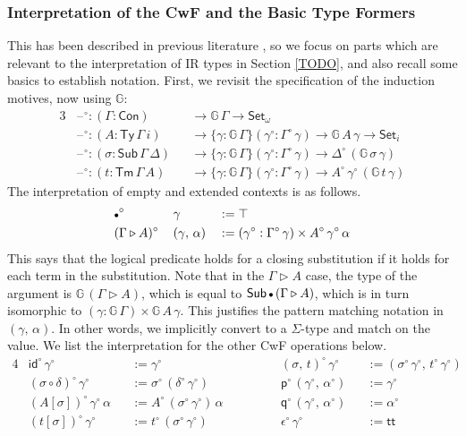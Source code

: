 \documentclass[acmsmall,screen,review,anonymous]{acmart}
\newcommand{\msf}[1]{{\mathsf{#1}}}
\newcommand{\mbb}[1]{\mathbb{#1}}
\newcommand{\p}{\mathsf{p}}
\newcommand{\q}{\mathsf{q}}
\newcommand{\Set}{\msf{Set}}
\newcommand{\ttt}{\msf{tt}}
\newcommand{\blank}{{\mathord{\hspace{1pt}\text{--}\hspace{1pt}}}}
\newcommand{\emptycon}{\scaleobj{.75}\bullet}
\newcommand{\id}{\msf{id}}
\newcommand{\Con}{\msf{Con}}
\newcommand{\Sub}{\msf{Sub}}
\newcommand{\Ty}{\msf{Ty}}
\newcommand{\Tm}{\msf{Tm}}
\newcommand{\ext}{\triangleright}
\newcommand{\w}{\circ}
\newcommand{\G}{\mbb{G}}
\begin{document}
\subsubsection{Interpretation of the CwF and the Basic Type Formers}
This has been described in previous literature \cite{TODO}, so we focus on parts which are relevant
to the interpretation of IR types in Section \ref{TODO}, and also recall some basics to establish
notation. First, we revisit the specification of the induction motives, now using $\G$:
\begin{alignat*}{3}
  &\blank^\w : (\Gamma : \Con)                 && \to \G\,\Gamma \to \Set_\omega\\
  &\blank^\w : (A : \Ty\,\Gamma\,i)            && \to \{\gamma : \G\,\Gamma\}(\gamma^\w : \Gamma^\w\,\gamma) \to \G\,A\,\gamma \to \Set_i\\
  &\blank^\w : (\sigma : \Sub\,\Gamma\,\Delta) && \to \{\gamma : \G\,\Gamma\}(\gamma^\w : \Gamma^\w\,\gamma) \to \Delta^\w\,(\G\,\sigma\,\gamma)\\
  &\blank^\w : (t : \Tm\,\Gamma\,A)            && \to \{\gamma : \G\,\Gamma\}(\gamma^\w : \Gamma^\w\,\gamma) \to A^\w\,\gamma^\w\,(\G\,t\,\gamma)
\end{alignat*}
The interpretation of empty and extended contexts is as follows.
\begin{alignat*}{3}
  &\emptycon^\w\,&&\gamma                 &&:= \top \\
  &(\Gamma\ext A)^\w\,&&(\gamma,\,\alpha) &&:= (\gamma^\w : \Gamma^\w\,\gamma) \times A^\w\,\gamma^\w\,\alpha
\end{alignat*}
This says that the logical predicate holds for a closing substitution if it holds for each term in
the substitution. Note that in the $\Gamma \ext A$ case, the type of the argument is $\G\,(\Gamma
\ext A)$, which is equal to $\Sub\,\emptycon\,(\Gamma \ext A)$, which is in turn isomorphic to
$(\gamma : \G\,\Gamma) \times \G\,A\,\gamma$. This justifies the pattern matching notation in
$(\gamma,\,\alpha)$. In other words, we implicitly convert to a $\Sigma$-type and match on the
value. We list the interpretation for the other CwF operations below.
\begin{alignat*}{4}
  &\id^\w\,\gamma^\w                   &&:= \gamma^\w                  &&(\sigma,\,t)^\w\,\gamma^\w          &&:= (\sigma^\w\,\gamma^\w,\,t^\w\,\gamma^\w)\\
  &(\sigma \circ \delta)^\w\,\gamma^\w &&:= \sigma^\w\,(\delta^\w\,\gamma^\w) && \p^\w\,(\gamma^\w,\,\alpha^\w)      &&:= \gamma^\w\\
  &(A[\sigma]) ^\w\,\gamma^\w\,\alpha  &&:= A^\w\,(\sigma^\w\,\gamma^\w)\,\alpha\hspace{3em} && \q^\w\,(\gamma^\w,\,\alpha^\w)      &&:= \alpha^\w\\
  &(t[\sigma]) ^\w\,\gamma^\w          &&:= t^\w\,(\sigma^\w\,\gamma^\w) && \epsilon^\w\,\gamma^\w              &&:= \ttt
\end{alignat*}
\end{document}
